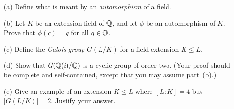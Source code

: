 \documentclass[a4paper]{article}
\begin{document}
\begin{problem}%
 \begin{itemize}
  \item[(a)] Define what is meant by an \emph{automorphism} of a
    field. 
  \item[(b)] Let $K$ be an extension field of ${\mathbb{Q}}$, and let $\phi$ be
   an automorphism of $K$.  Prove that $\phi(q)=q$ for all $q\in{\mathbb{Q}}$.
  \item[(c)] Define the \emph{Galois group} $G(L/K)$ for a field
   extension $K\leq L$. 
  \item[(d)] Show that $G({\mathbb{Q}}(i)/{\mathbb{Q}})$ is a cyclic group of order two.
   (Your proof should be complete and self-contained, except that you
   may assume part~(b).) 
  \item[(e)] Give an example of an extension $K\leq L$ where $[L:K]=4$
   but $|G(L/K)|=2$.  Justify your answer.
 \end{itemize}
\end{problem}
\end{document}

